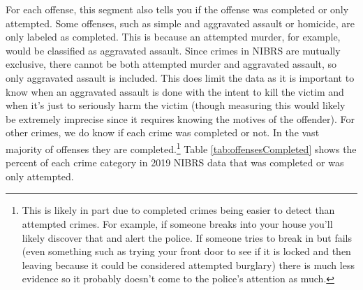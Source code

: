 \documentclass[
  12pt,
  openany]{book}
\begin{document}
For each offense, this segment also tells you if the offense was completed or only attempted. Some offenses, such as simple and aggravated assault or homicide, are only labeled as completed. This is because an attempted murder, for example, would be classified as aggravated assault. Since crimes in NIBRS are mutually exclusive, there cannot be both attempted murder and aggravated assault, so only aggravated assault is included. This does limit the data as it is important to know when an aggravated assault is done with the intent to kill the victim and when it's just to seriously harm the victim (though measuring this would likely be extremely imprecise since it requires knowing the motives of the offender). For other crimes, we do know if each crime was completed or not. In the vast majority of offenses they are completed.\footnote{This is likely in part due to completed crimes being easier to detect than attempted crimes. For example, if someone breaks into your house you'll likely discover that and alert the police. If someone tries to break in but fails (even something such as trying your front door to see if it is locked and then leaving because it could be considered attempted burglary) there is much less evidence so it probably doesn't come to the police's attention as much.} Table \ref{tab:offensesCompleted} shows the percent of each crime category in 2019 NIBRS data that was completed or was only attempted.
\end{document}
